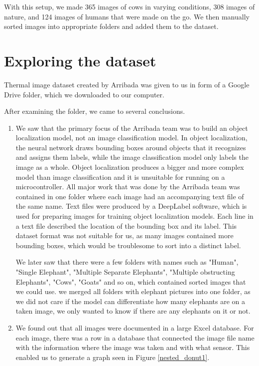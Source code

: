 With this setup, we made 365 images of cows in varying conditions, 308 images of nature, and 124 images of humans that were made on the go.
We then manually sorted images into appropriate folders and added them to the dataset.


\section{ Exploring the dataset} \label{exploring_dataset}

Thermal image dataset created by Arribada was given to us in form of a Google Drive folder, which we downloaded to our computer. 

After examining the folder, we came to several conclusions.

\begin{enumerate}
    \item We saw that the primary focus of the Arribada team was to build an object localization model, not an image classification model.
In object localization, the neural network draws bounding boxes around objects that it recognizes and assigns them labels, while the image classification model only labels the image as a whole.
Object localization produces a bigger and more complex model than image classification and it is unsuitable for running on a microcontroller.
All major work that was done by the Arribada team was contained in one folder where each image had an accompanying text file of the same name.
Text files were produced by a DeepLabel software, which is used for preparing images for training object localization models.
Each line in a text file described the location of the bounding box and its label.
This dataset format was not suitable for us, as many images contained more bounding boxes, which would be troublesome to sort into a distinct label.

We later saw that there were a few folders with names such as "Human", "Single Elephant", "Multiple Separate Elephants", "Multiple obstructing Elephants", "Cows", "Goats" and so on, which contained sorted images that we could use.
we merged all folders with elephant pictures into one folder, as we did not care if the model can differentiate how many elephants are on a taken image, we only wanted to know if there are any elephants on it or not.

    \item We found out that all images were documented in a large Excel database.
For each image, there was a row in a database that connected the image file name with the information where the image was taken and with what sensor.
This enabled us to generate a graph seen in Figure \ref{nested_donut1}.


\end{enumerate}
